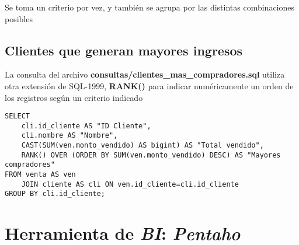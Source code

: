 Se toma un criterio por vez, y también se agrupa por las distintas combinaciones posibles



\subsection{Clientes que generan mayores ingresos}

La consulta del archivo \textbf{consultas/clientes\_mas\_compradores.sql} utiliza otra extensión de SQL-1999, \textbf{RANK()} para indicar numéricamente un orden de los registros según un criterio indicado  

\vspace*{5mm}
\begin{lstlisting}[title=Clientes que generan mayores ingresos para la empresa]
SELECT 
    cli.id_cliente AS "ID Cliente", 
    cli.nombre AS "Nombre", 
    CAST(SUM(ven.monto_vendido) AS bigint) AS "Total vendido", 
    RANK() OVER (ORDER BY SUM(ven.monto_vendido) DESC) AS "Mayores compradores" 
FROM venta AS ven 
    JOIN cliente AS cli ON ven.id_cliente=cli.id_cliente 
GROUP BY cli.id_cliente;
\end{lstlisting}




\section{Herramienta de \emph{BI}: \emph{Pentaho}}






\clearpage
\printbibliography



